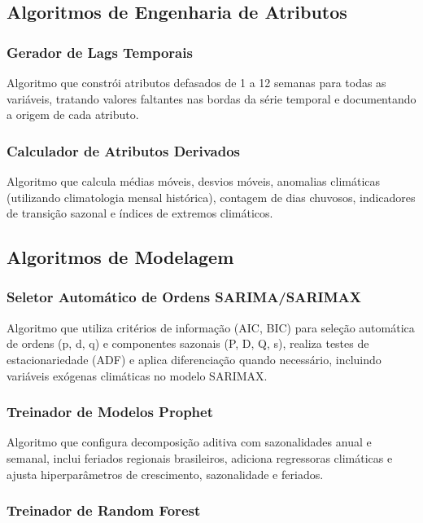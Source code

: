 \subsection{Algoritmos de Engenharia de Atributos}

\subsubsection{Gerador de Lags Temporais}

Algoritmo que constrói atributos defasados de 1 a 12 semanas para todas as variáveis, tratando valores faltantes nas bordas da série temporal e documentando a origem de cada atributo.

\subsubsection{Calculador de Atributos Derivados}

Algoritmo que calcula médias móveis, desvios móveis, anomalias climáticas (utilizando climatologia mensal histórica), contagem de dias chuvosos, indicadores de transição sazonal e índices de extremos climáticos.

\subsection{Algoritmos de Modelagem}

\subsubsection{Seletor Automático de Ordens SARIMA/SARIMAX}

Algoritmo que utiliza critérios de informação (AIC, BIC) para seleção automática de ordens (p, d, q) e componentes sazonais (P, D, Q, s), realiza testes de estacionariedade (ADF) e aplica diferenciação quando necessário, incluindo variáveis exógenas climáticas no modelo SARIMAX.

\subsubsection{Treinador de Modelos Prophet}

Algoritmo que configura decomposição aditiva com sazonalidades anual e semanal, inclui feriados regionais brasileiros, adiciona regressoras climáticas e ajusta hiperparâmetros de crescimento, sazonalidade e feriados.

\subsubsection{Treinador de Random Forest}

